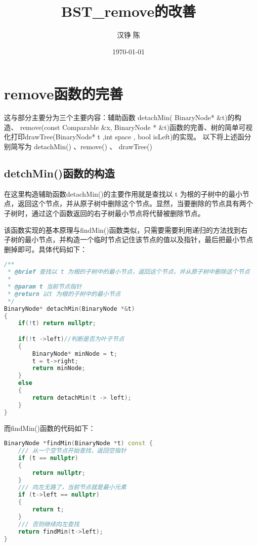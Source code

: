 \documentclass[fontset=fandol]{ctexart}
\title{BST\_remove的改善}
\author{汉铮 陈}
\date{\today}
\begin{document}
\maketitle

\section{remove函数的完善}
这与部分主要分为三个主要内容：辅助函数 detachMin( BinaryNode* \&t)的构造、
remove(const Comparable \&x, BinaryNode * \&t)函数的完善、树的简单可视化打印drawTree(BinaryNode* t ,int space , bool isLeft)的实现。
以下将上述函分别简写为 detachMin() 、remove() 、 drawTree()

\subsection{detchMin()函数的构造}
在这里构造辅助函数detachMin()的主要作用就是查找以 t 为根的子树中的最小节点，返回这个节点，并从原子树中删除这个节点。显然，当要删除的节点具有两个子树时，通过这个函数返回的右子树最小节点将代替被删除节点。\par
该函数实现的基本原理与findMin()函数类似，只需要需要利用递归的方法找到右子树的最小节点，并构造一个临时节点记住该节点的值以及指针，最后把最小节点删掉即可。具体代码如下：

\begin{lstlisting}[language=C++, caption={detachMin()函数}]  
/**
 * @brief 查找以 t 为根的子树中的最小节点，返回这个节点，并从原子树中删除这个节点
 * 
 * @param t 当前节点指针
 * @return 以t 为根的子树中的最小节点
 */
BinaryNode* detachMin(BinaryNode *&t)
{
    if(!t) return nullptr;

    if(!t ->left)//判断是否为叶子节点
    {
        BinaryNode* minNode = t;
        t = t->right;
        return minNode; 
    }
    else
    {
        return detachMin(t -> left);
    }
}
\end{lstlisting}

而findMin()函数的代码如下：
\begin{lstlisting}[language=C++, caption={findMin()函数}]  
BinaryNode *findMin(BinaryNode *t) const {
    /// 从一个空节点开始查找，返回空指针                
    if (t == nullptr) 
    {
        return nullptr;
    }
    /// 向左无路了，当前节点就是最小元素
    if (t->left == nullptr) 
    {
        return t;
    }
    /// 否则继续向左查找
    return findMin(t->left);
}
\end{lstlisting}
\end{document}
